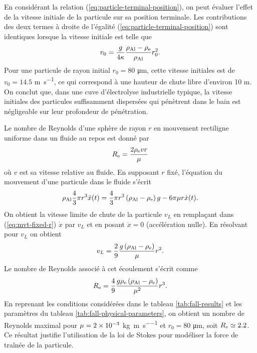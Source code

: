 \begin{remarque}
  En considérant la relation (\ref{eq:particle-terminal-position}), on
  peut évaluer l'effet de la vitesse initiale de la particule sur sa
  position terminale. Les contributions des deux termes à droite de
  l'égalité (\ref{eq:particle-terminal-position}) sont identiques
  lorsque la vitesse initiale est telle que
  \begin{equation*}
    v_0 = \frac{g}{4\kappa}\frac{\rho_\mathrm{Al} -
      \rho_\mathrm{e}}{\rho_\mathrm{Al}} r_0^2.
  \end{equation*}
  Pour une particule de rayon initial $r_0 = \num{80}$
  \si{\micro\meter}, cette vitesse initiales est de $v_0 = \num{14.5}$
  \si{\meter\per\second}, ce qui correspond à une hauteur de chute
  libre d'environ \num{10} \si{\meter}. On conclut que, dans une cuve
  d'électrolyse industrielle typique, la vitesse initiales des
  particules suffisamment dispersées qui pénètrent dans le bain est
  négligeable sur leur profondeur de pénétration.
\end{remarque}

\begin{remarque}
  Le nombre de Reynolds d'une sphère de rayon $r$ en mouvement
  rectiligne uniforme dans un fluide au repos est donné par
  \begin{equation*}
    R_{\mathrm e} = \frac{2 \rho_\mathrm{e} v r}{\mu}
  \end{equation*}
  où $v$ est sa vitesse relative au fluide.  En supposant $r$ fixé,
  l'équation du mouvement d'une particule dans le fluide s'écrit
  \begin{equation}\label{eq:mvt-fixed-r}
    \rho_\mathrm{Al} \frac{4}{3}\pi r^3 \ddot x(t) = \frac{4}{3}\pi
    r^3\left( \rho_\mathrm{Al} - \rho_\mathrm{e} \right)g -
  6\pi\mu r\dot x(t).
  \end{equation}
  On obtient la vitesse limite de chute de la particule $v_L$ en
  remplaçant dans (\ref{eq:mvt-fixed-r}) $\dot x$ par $v_L$ et en posant $\ddot x
  = 0$ (accélération nulle). En résolvant pour $v_L$ on obtient
  \begin{equation}\label{eq:terminal-velocity}
    v_L = \frac{2}{9}\frac{g\left( \rho_\mathrm{Al} - \rho_\mathrm{e} \right)}{\mu}r^2.
  \end{equation}
  Le nombre de Reynolds associé à cet écoulement s'écrit comme
  \begin{equation*}
    R_{\mathrm e} =
    \frac{4}{9}\frac{g\rho_\mathrm{e}\left( \rho_\mathrm{Al} - \rho_\mathrm{e} \right)}{\mu^2}r^3.
  \end{equation*}
  En reprenant les conditions considérées dans le tableau
  \ref{tab:fall-results} et les paramètres du tableau
  \ref{tab:fall-physical-parameters}, on obtient un nombre de Reynolds
  maximal pour $\mu = \num{2e-3}$
  \si{\kilo\gram\per\meter\per\second} et $r_0 = 80$
  \si{\micro\meter}, soit $R_{\mathrm e} \simeq 2.2$. Ce résultat justifie
  l'utilisation de la loi de Stokes pour modéliser la force de traînée
  de la particule.
\end{remarque}

